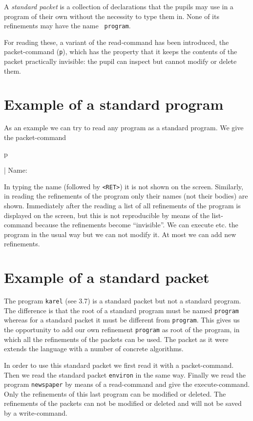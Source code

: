 A {\em standard packet} is a collection of declarations that
the pupils may use in a program of their own without the necessity
to type them in. None of its refinements may have the name {\tt
program}.

For reading these, a variant of the read-command has been introduced,
the packet-command ({\tt p}), which has the property that it
keeps the contents of the packet practically invisible: the pupil
can inspect but cannot modify or delete them.

\section{Example of a standard program}

As an example we can try to read any program as a standard program.
We give the packet-command

\begin{elan}
        p

|       Name:\cursor
\end{elan}

\noindent
In typing the name (followed by {\tt <RET>}) it is not shown on the
screen. Similarly, in reading the refinements of the program
only their names (not their bodies) are shown. Immediately after
the reading a list of all refinements of the program is displayed
on the screen, but this is not reproducible by means of the list-command
because the refinements become ``invisible''. We can execute etc.
the program in the usual way but we can not modify it. At most
we can add new refinements.

\section{Example of a standard packet}

The program {\tt karel} (see 3.7) is a standard packet but not
a standard program. The difference is that the root of a standard
program must be named {\tt program} whereas for a standard packet
it must be different from {\tt program}. This gives us the opportunity
to add our own refinement {\tt program} as root of the program,
in which all the refinements of the packets can be used. The
packet as it were extends the language with a number of concrete
algorithms.

In order to use this standard packet we first read it with a
packet-command. Then we read the standard packet {\tt environ}
in the same way. Finally we read the program {\tt newspaper}
by means of a read-command and give the execute-command. Only
the refinements of this last program can be modified or deleted.
The refinements of the packets can not be modified or deleted
and will not be saved by a write-command.


